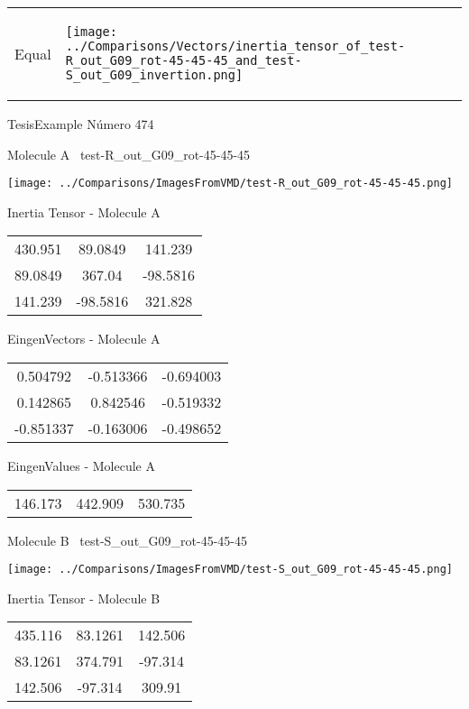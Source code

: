 \vtab[-5mm]
\begin{tabular}{*{2}{m{}}}
\begin{center}
\textcolor{NavyBlue}{\Large Equal}
\end{center}
&
\begin{center}
\texttt{[image: ../Comparisons/Vectors/inertia\_tensor\_of\_test-R\_out\_G09\_rot-45-45-45\_and\_test-S\_out\_G09\_invertion.png]}
\end{center}
\end{tabular}

 \newpage

\vtab[-3cm]
\begin{center}
{\large TesisExample \tab Número 474}
\end{center}
\begin{multicols}{2}
\begin{center}

Molecule A \
test-R\_out\_G09\_rot-45-45-45

\texttt{[image: ../Comparisons/ImagesFromVMD/test-R\_out\_G09\_rot-45-45-45.png]}

Inertia Tensor - Molecule A \\
\begin{tabular}{|c c c|}
430.951	 & 	89.0849	 & 	141.239	 \\
89.0849	 & 	367.04	 & 	-98.5816	 \\
141.239	 & 	-98.5816	 & 	321.828
\end{tabular}

\vtab
 EingenVectors - Molecule A     \\
\begin{tabular}{|c c c|}
0.504792	 & 	-0.513366	 & 	-0.694003	 \\
0.142865	 & 	0.842546	 & 	-0.519332	 \\
-0.851337	 & 	-0.163006	 & 	-0.498652
\end{tabular}

\vtab
 EingenValues - Molecule A     \\
\begin{tabular}{|c c c|}
146.173	 & 	442.909	 & 	530.735	 \\
\end{tabular}
\columnbreak

Molecule B \
test-S\_out\_G09\_rot-45-45-45

\texttt{[image: ../Comparisons/ImagesFromVMD/test-S\_out\_G09\_rot-45-45-45.png]}

Inertia Tensor - Molecule B \\
\begin{tabular}{|c c c|}
435.116	 & 	83.1261	 & 	142.506	 \\
83.1261	 & 	374.791	 & 	-97.314	 \\
142.506	 & 	-97.314	 & 	309.91
\end{tabular}


\end{center}
\end{multicols}
